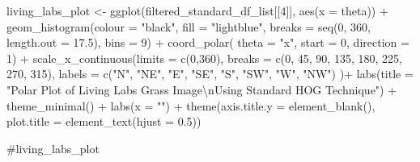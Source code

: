 \documentclass[
  letterpaper,
  DIV=11,
  numbers=noendperiod]{scrreprt}
\newenvironment{Shaded}{\begin{snugshade}}{\end{snugshade}}
\newcommand{\AttributeTok}[1]{\textcolor[rgb]{0.40,0.45,0.13}{#1}}
\newcommand{\CommentTok}[1]{\textcolor[rgb]{0.37,0.37,0.37}{#1}}
\newcommand{\DecValTok}[1]{\textcolor[rgb]{0.68,0.00,0.00}{#1}}
\newcommand{\FloatTok}[1]{\textcolor[rgb]{0.68,0.00,0.00}{#1}}
\newcommand{\FunctionTok}[1]{\textcolor[rgb]{0.28,0.35,0.67}{#1}}
\newcommand{\NormalTok}[1]{\textcolor[rgb]{0.00,0.23,0.31}{#1}}
\newcommand{\OtherTok}[1]{\textcolor[rgb]{0.00,0.23,0.31}{#1}}
\newcommand{\SpecialCharTok}[1]{\textcolor[rgb]{0.37,0.37,0.37}{#1}}
\newcommand{\StringTok}[1]{\textcolor[rgb]{0.13,0.47,0.30}{#1}}
\begin{document}
\begin{Shaded}
\begin{Highlighting}[]
\NormalTok{living\_labs\_plot }\OtherTok{\textless{}{-}}
  \FunctionTok{ggplot}\NormalTok{(filtered\_standard\_df\_list[[}\DecValTok{4}\NormalTok{]], }
         \FunctionTok{aes}\NormalTok{(}\AttributeTok{x =}\NormalTok{ theta)) }\SpecialCharTok{+}
  \FunctionTok{geom\_histogram}\NormalTok{(}\AttributeTok{colour =} \StringTok{"black"}\NormalTok{, }
                 \AttributeTok{fill =} \StringTok{"lightblue"}\NormalTok{, }
                 \AttributeTok{breaks =} \FunctionTok{seq}\NormalTok{(}\DecValTok{0}\NormalTok{, }\DecValTok{360}\NormalTok{, }\AttributeTok{length.out =} \FloatTok{17.5}\NormalTok{),}
                 \AttributeTok{bins =} \DecValTok{9}\NormalTok{) }\SpecialCharTok{+}
  \FunctionTok{coord\_polar}\NormalTok{(}
    \AttributeTok{theta =} \StringTok{"x"}\NormalTok{, }\AttributeTok{start =} \DecValTok{0}\NormalTok{, }\AttributeTok{direction =} \DecValTok{1}\NormalTok{) }\SpecialCharTok{+}
  \FunctionTok{scale\_x\_continuous}\NormalTok{(}\AttributeTok{limits =} \FunctionTok{c}\NormalTok{(}\DecValTok{0}\NormalTok{,}\DecValTok{360}\NormalTok{),}
    \AttributeTok{breaks =} \FunctionTok{c}\NormalTok{(}\DecValTok{0}\NormalTok{, }\DecValTok{45}\NormalTok{, }\DecValTok{90}\NormalTok{, }\DecValTok{135}\NormalTok{, }\DecValTok{180}\NormalTok{, }\DecValTok{225}\NormalTok{, }\DecValTok{270}\NormalTok{, }\DecValTok{315}\NormalTok{), }
    \AttributeTok{labels =} \FunctionTok{c}\NormalTok{(}\StringTok{"N"}\NormalTok{, }\StringTok{"NE"}\NormalTok{, }\StringTok{"E"}\NormalTok{, }\StringTok{"SE"}\NormalTok{, }\StringTok{"S"}\NormalTok{, }\StringTok{"SW"}\NormalTok{, }\StringTok{"W"}\NormalTok{, }\StringTok{"NW"}\NormalTok{)}
\NormalTok{  )}\SpecialCharTok{+}
  \FunctionTok{labs}\NormalTok{(}\AttributeTok{title =} \StringTok{"Polar Plot of Living Labs Grass Image}\SpecialCharTok{\textbackslash{}n}\StringTok{Using Standard HOG Technique"}\NormalTok{) }\SpecialCharTok{+}
  \FunctionTok{theme\_minimal}\NormalTok{() }\SpecialCharTok{+}
  \FunctionTok{labs}\NormalTok{(}\AttributeTok{x =} \StringTok{""}\NormalTok{) }\SpecialCharTok{+}
  \FunctionTok{theme}\NormalTok{(}\AttributeTok{axis.title.y =} \FunctionTok{element\_blank}\NormalTok{(),}
        \AttributeTok{plot.title =} \FunctionTok{element\_text}\NormalTok{(}\AttributeTok{hjust =} \FloatTok{0.5}\NormalTok{))}

\CommentTok{\#living\_labs\_plot}
\end{Highlighting}
\end{Shaded}
\end{document}
